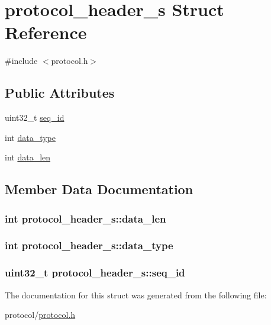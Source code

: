 \hypertarget{structprotocol__header__s}{\section{protocol\-\_\-header\-\_\-s Struct Reference}
\label{structprotocol__header__s}
}


{\ttfamily \#include $<$protocol.\-h$>$}

\subsection*{Public Attributes}
\begin{DoxyCompactItemize}
\item 
uint32\-\_\-t \hyperlink{structprotocol__header__s_af153f4cfa2780dd83c3edc1d5b057568}{seq\-\_\-id}
\item 
int \hyperlink{structprotocol__header__s_a1e059fbc01477a945a5cf2942a344c72}{data\-\_\-type}
\item 
int \hyperlink{structprotocol__header__s_a453857f56ff79666a8121faf1c5ab9d3}{data\-\_\-len}
\end{DoxyCompactItemize}


\subsection{Member Data Documentation}
\hypertarget{structprotocol__header__s_a453857f56ff79666a8121faf1c5ab9d3}{
\subsubsection[{data\-\_\-len}]{\setlength{\rightskip}{0pt plus 5cm}int protocol\-\_\-header\-\_\-s\-::data\-\_\-len}}\label{structprotocol__header__s_a453857f56ff79666a8121faf1c5ab9d3}
\hypertarget{structprotocol__header__s_a1e059fbc01477a945a5cf2942a344c72}{
\subsubsection[{data\-\_\-type}]{\setlength{\rightskip}{0pt plus 5cm}int protocol\-\_\-header\-\_\-s\-::data\-\_\-type}}\label{structprotocol__header__s_a1e059fbc01477a945a5cf2942a344c72}
\hypertarget{structprotocol__header__s_af153f4cfa2780dd83c3edc1d5b057568}{
\subsubsection[{seq\-\_\-id}]{\setlength{\rightskip}{0pt plus 5cm}uint32\-\_\-t protocol\-\_\-header\-\_\-s\-::seq\-\_\-id}}\label{structprotocol__header__s_af153f4cfa2780dd83c3edc1d5b057568}


The documentation for this struct was generated from the following file\-:\begin{DoxyCompactItemize}
\item 
protocol/\hyperlink{protocol_8h}{protocol.\-h}\end{DoxyCompactItemize}
